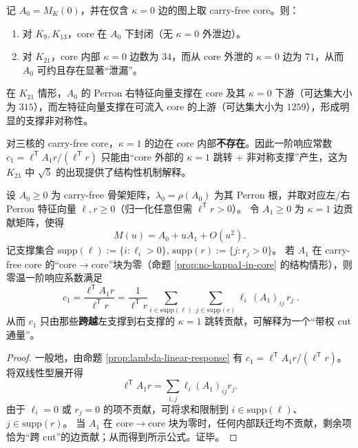 \begin{proposition}\label{prop:carry-free-leakage}
记 $A_0=M_K(0)$，并在仅含 $\kappa=0$ 边的图上取 carry-free core。则：
\begin{enumerate}
  \item 对 $K_9,K_{13}$，core 在 $A_0$ 下封闭（无 $\kappa=0$ 外泄边）。
  \item 对 $K_{21}$，core 内部 $\kappa=0$ 边数为 $34$，而从 core 外泄的 $\kappa=0$ 边为 $71$，从而 $A_0$ 可约且存在显著“泄漏”。
\end{enumerate}
在 $K_{21}$ 情形，$A_0$ 的 Perron 右特征向量支撑在 core 及其 $\kappa=0$ 下游（可达集大小为 $315$），而左特征向量支撑在可流入 core 的上游（可达集大小为 $1259$），形成明显的支撑非对称性。
\end{proposition}

\begin{proposition}\label{prop:no-kappa1-in-core}
对三核的 carry-free core，$\kappa=1$ 的边在 core 内部\textbf{不存在}。因此一阶响应常数
\(
c_1=\ell^{\mathsf T}A_1r/(\ell^{\mathsf T}r)
\)
只能由“core 外部的 $\kappa=1$ 跳转 + 非对称支撑”产生，这为 $K_{21}$ 中 $\sqrt5$ 的出现提供了结构性机制解释。
\end{proposition}

\begin{proposition}[支撑剪切（cut-flux）公式：\texorpdfstring{$\kappa=1$}{kappa=1} 不在 core 内部时的一阶通量]\label{prop:c1-cut-flux}
设 \(A_0\ge 0\) 为 carry-free 骨架矩阵，\(\lambda_0=\rho(A_0)\) 为其 Perron 根，并取对应左/右 Perron 特征向量 \(\ell,r\ge 0\)（归一化任意但需 \(\ell^{\mathsf T}r>0\)）。
令 \(A_1\ge 0\) 为 \(\kappa=1\) 边贡献矩阵，使得
\[
M(u)=A_0+uA_1+O(u^2).
\]
记支撑集合
\(
\mathrm{supp}(\ell):=\{i:\ell_i>0\}
\),
\(
\mathrm{supp}(r):=\{j:r_j>0\}
\)。
若 \(A_1\) 在 carry-free core 的“core\(\to\)core”块为零（命题 \ref{prop:no-kappa1-in-core} 的结构情形），则零温一阶响应系数满足
\[
\boxed{\;
c_1=\frac{\ell^{\mathsf T}A_1r}{\ell^{\mathsf T}r}
=\frac{1}{\ell^{\mathsf T}r}\sum_{i\in\mathrm{supp}(\ell)}\sum_{j\in\mathrm{supp}(r)}\ell_i\,(A_1)_{ij}\,r_j\; }.
\]
从而 \(c_1\) 只由那些\textbf{跨越}左支撑到右支撑的 \(\kappa=1\) 跳转贡献，可解释为一个“带权 cut 通量”。
\end{proposition}
\begin{proof}
一般地，由命题 \ref{prop:lambda-linear-response} 有
\(
c_1=\ell^{\mathsf T}A_1r/(\ell^{\mathsf T}r)
\)。
将双线性型展开得
\[
\ell^{\mathsf T}A_1r=\sum_{i,j}\ell_i(A_1)_{ij}r_j.
\]
由于 \(\ell_i=0\) 或 \(r_j=0\) 的项不贡献，可将求和限制到 \(i\in\mathrm{supp}(\ell)\)、\(j\in\mathrm{supp}(r)\)。
当 \(A_1\) 在 core\(\to\)core 块为零时，任何内部跃迁均不贡献，剩余项恰为“跨 cut”的边贡献；从而得到所示公式。证毕。
\end{proof}

